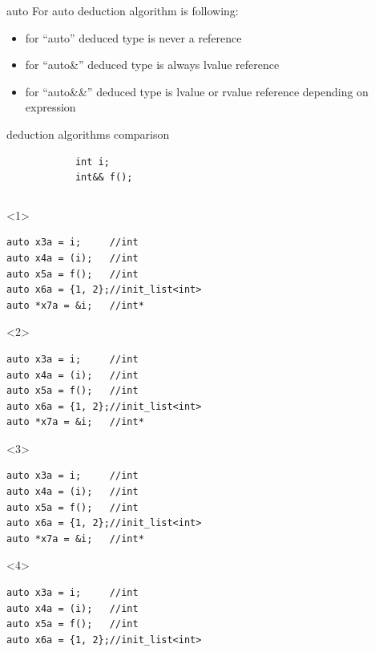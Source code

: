 \documentclass[10pt]{beamer}
\begin{document}
\begin{frame}[fragile]{auto}
	For \alert{auto} deduction algorithm is following:
	\begin{itemize}[<+- |alert@+>]
		\item for \alert{\enquote{auto}} deduced type is never a reference
		\item for \alert{\enquote{auto\&}} deduced type is always lvalue reference
		\item for \alert{\enquote{auto\&\&}} deduced type is lvalue or rvalue reference depending on expression
	\end{itemize}
\end{frame}

\begin{frame}[fragile]{deduction algorithms comparison}
\centering
	\begin{verbatim}
			int i;
			int&& f();
	\end{verbatim}
	\vfill
	\begin{columns}
	\begin{column}{0.48\linewidth}
	\begin{onlyenv}
		\begin{verbatim}
auto x3a = i;     //int
auto x4a = (i);   //int
auto x5a = f();   //int
auto x6a = {1, 2};//init_list<int>
auto *x7a = &i;   //int*
		\end{verbatim}
	\end{onlyenv}
	\begin{onlyenv}
		\begin{verbatim}
auto x3a = i;     //int
auto x4a = (i);   //int
auto x5a = f();   //int
auto x6a = {1, 2};//init_list<int>
auto *x7a = &i;   //int*
		\end{verbatim}
	\end{onlyenv}
	\begin{onlyenv}
		\begin{verbatim}
auto x3a = i;     //int
auto x4a = (i);   //int
auto x5a = f();   //int
auto x6a = {1, 2};//init_list<int>
auto *x7a = &i;   //int*
		\end{verbatim}
	\end{onlyenv}
	\begin{onlyenv}
		\begin{verbatim}
auto x3a = i;     //int
auto x4a = (i);   //int
auto x5a = f();   //int
auto x6a = {1, 2};//init_list<int>

\end{verbatim}
\end{onlyenv}
\end{column}
\end{columns}
\end{frame}
\end{document}

